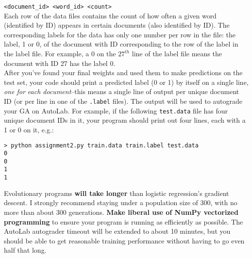 \documentclass[paper=a4, fontsize=11pt]{scrartcl} %
\numberwithin{figure}{section} %
\numberwithin{table}{section} %
\begin{document}
\texttt{<document\_id> <word\_id> <count>} \\

Each row of the data files contains the count of how often a given word (identified by ID) appears in certain documents (also identified by ID). The corresponding labels for the data has only one number per row in the file: the label, 1 or 0, of the document with ID corresponding to the row of the label in the label file. For example, a 0 on the $27^{th}$ line of the label file means the document with ID 27 has the label 0. \\

After you've found your final weights and used them to make predictions on the test set, your code should print a predicted label (0 or 1) by itself on a single line, \emph{one for each document}--this means a single line of output per unique document ID (or per line in one of the \texttt{.label} files). The output will be used to autograde your GA on AutoLab. For example, if the following \texttt{test.data} file has four unique document IDs in it, your program should print out four lines, each with a 1 or 0 on it, e.g.:

\begin{verbatim}
> python assignment2.py train.data train.label test.data
0
0
1
1
\end{verbatim}

Evolutionary programs \textbf{will take longer} than logistic regression's gradient descent. I strongly recommend staying under a population size of 300, with no more than about 300 generations. \textbf{Make liberal use of NumPy vectorized programming} to ensure your program is running as efficiently as possible. The AutoLab autograder timeout will be extended to about 10 minutes, but you should be able to get reasonable training performance without having to go even half that long.
\end{document}
